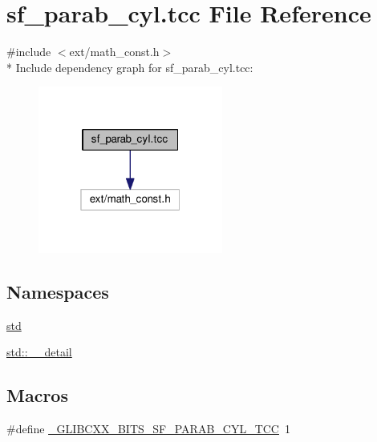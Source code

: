 \hypertarget{sf__parab__cyl_8tcc}{}\section{sf\+\_\+parab\+\_\+cyl.\+tcc File Reference}
\label{sf__parab__cyl_8tcc}
{\ttfamily \#include $<$ext/math\+\_\+const.\+h$>$}\\*
Include dependency graph for sf\+\_\+parab\+\_\+cyl.\+tcc\+:
\nopagebreak
\begin{figure}[H]
\begin{center}
\leavevmode
\includegraphics[width=172pt]{sf__parab__cyl_8tcc__incl}
\end{center}
\end{figure}
\subsection*{Namespaces}
\begin{DoxyCompactItemize}
\item 
 \hyperlink{namespacestd}{std}
\item 
 \hyperlink{namespacestd_1_1____detail}{std\+::\+\_\+\+\_\+detail}
\end{DoxyCompactItemize}
\subsection*{Macros}
\begin{DoxyCompactItemize}
\item 
\#define \hyperlink{sf__parab__cyl_8tcc_a132aa9631b9dba6c29027d48adf79d81}{\+\_\+\+G\+L\+I\+B\+C\+X\+X\+\_\+\+B\+I\+T\+S\+\_\+\+S\+F\+\_\+\+P\+A\+R\+A\+B\+\_\+\+C\+Y\+L\+\_\+\+T\+C\+C}~1
\end{DoxyCompactItemize}

